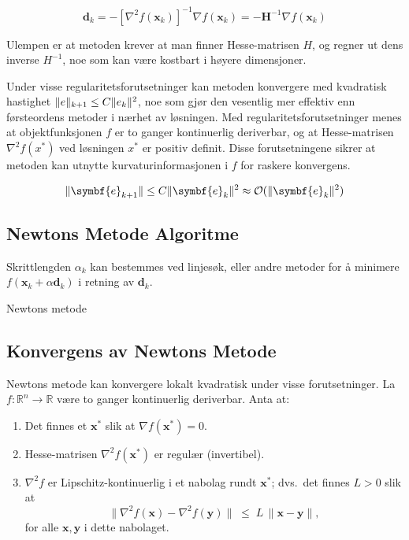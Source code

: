 \[
	\symbf{d}_k = -[\nabla^2 f(\symbf{x}_k)]^{-1} \nabla f(\symbf{x}_k) = -\symbf{H}^{-1} \nabla f(\symbf{x}_k)
\]

Ulempen er at metoden krever at man finner Hesse-matrisen $H$, og regner ut dens inverse $H^{-1}$, noe som kan være kostbart i høyere dimensjoner.

Under visse regularitetsforutsetninger kan metoden konvergere med kvadratisk hastighet $\lVert e\rVert_{k+1} \leq C \lVert e_k\rVert^2$, noe som gjør den vesentlig mer effektiv enn førsteordens metoder i nærhet av løsningen.
Med regularitetsforutsetninger menes at objektfunksjonen $f$ er to ganger kontinuerlig deriverbar, og at Hesse-matrisen $\nabla^2 f(x^\ast)$ ved løsningen $x^\ast$ er positiv definit.
Disse forutsetningene sikrer at metoden kan utnytte kurvaturinformasjonen i $f$ for raskere konvergens.

\[
	\norm{\symbf{e}_{k+1}} \leq C \norm{\symbf{e}_k}^2 \approx \mathcal{O}(\norm{\symbf{e}_k}^2)
\]

\subsection{Newtons Metode Algoritme}
Skrittlengden \(\alpha_k\) kan bestemmes ved linjesøk, eller andre metoder for å minimere \(f(\symbf{x}_k + \alpha \symbf{d}_k)\) i retning av \(\symbf{d}_k\).

\begin{algorithm}[H]
	\SetAlgoLined
	\caption{Newtons metode}
\end{algorithm}

\subsection{Konvergens av Newtons Metode}
Newtons metode kan konvergere lokalt kvadratisk under visse forutsetninger.
La \( f : \mathbb{R}^n \to \mathbb{R} \) være to ganger kontinuerlig deriverbar. Anta at:

\begin{enumerate}
	\item Det finnes et \(\symbf{x}^\ast\) slik at \(\nabla f(\symbf{x}^\ast) = 0\).
	\item Hesse-matrisen \(\nabla^2 f(\symbf{x}^\ast)\) er regulær (invertibel).
	\item \(\nabla^2 f\) er Lipschitz-kontinuerlig i et nabolag rundt \(\symbf{x}^\ast\); dvs.\ det finnes \( L > 0 \) slik at
	      \[
		      \| \nabla^2 f(\symbf{x}) - \nabla^2 f(\symbf{y}) \|
		      \;\le\;
		      L\,\|\symbf{x} - \symbf{y}\|,
	      \]
	      for alle \(\symbf{x}, \symbf{y}\) i dette nabolaget.
\end{enumerate}

